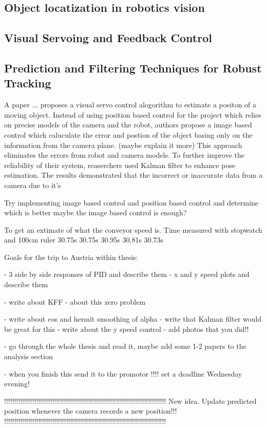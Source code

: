 \subsection{Object locatization in robotics vision}

\subsection{Visual Servoing and Feedback Control}

\subsection{Prediction and Filtering Techniques for Robust Tracking}
A paper ... proposes a visual servo control alogorithm to estimate a positon of
a moving object. Instead of using position based control for the project which relies on
precise models of the camera and the robot, authors propose a image based control which
caluculate the error and postion of the object basing only on the information from the camera
plane. (maybe explain it more) This approach eliminates the errors from robot and camera models.
To further improve the reliability of their system, reaserchers used Kalman filter to
enhance pose estimation. The results demonstrated that the incorrect or inaccurate data
from a camera due to it's 

Try implementing image based control and position based control and determine which is better
maybe the image based control is enough?


To get an extimate of what the conveyor speed is.
Time measured with stopwatch and 100cm ruler
30.75s
30.75s
30.95s
30.81s
30.73s


















Goals for the trip to Austria within thesis:

- 3 side by side responses of PID and describe them
- x and y speed plots and describe them

- write about KFF
- about this zero problem

- write about cos and hermit smoothing of alpha
- write that Kalman filter would be great for this
- write about the y speed control
- add photos that you did!!

- go through the whole thesis and read it, maybe add some 1-2 papers to the analysis section

- when you finish this send it to the promotor !!!! set a deadline Wednesday evening!


!!!!!!!!!!!!!!!!!!!!!!!!!!!!!!!!!!!!!!!!!!!!!!!!!!!!!!!!!!!!!!!!!!!!!!!!!!!!!!!!!
New idea. Update predicted position whenever the camera records a new position!!!
!!!!!!!!!!!!!!!!!!!!!!!!!!!!!!!!!!!!!!!!!!!!!!!!!!!!!!!!!!!!!!!!!!!!!!!!!!!!!!!!!

